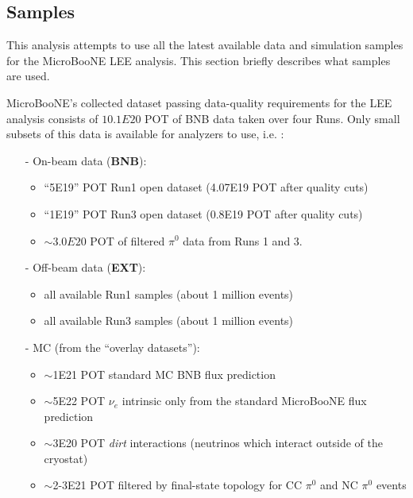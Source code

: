 \documentclass[a4paper]{article}
\begin{document}
\subsection{Samples}
\par This analysis attempts to use all the latest available data and simulation samples for the MicroBooNE LEE analysis. This section briefly describes what samples are used.
\par MicroBooNE's collected dataset passing  data-quality requirements for the LEE analysis consists of $10.1E20$ POT of BNB data taken over four Runs. %
Only small subsets of this data is available for analyzers to use, i.e. :
\begin{itemize}
\item[-] On-beam data (\textbf{BNB}):
\begin{itemize}
\item ``5E19'' POT Run1 open dataset (4.07E19 POT after quality cuts)
\item  ``1E19'' POT Run3 open dataset  (0.8E19 POT after quality cuts) 
\item  $\sim3.0E20$ POT of filtered $\pi^0$ data from Runs 1 and 3. 
\end{itemize}
\item[-] Off-beam data (\textbf{EXT}):
\begin{itemize}
\item all available Run1 samples (about 1 million events)
\item all available Run3 samples (about 1 million events)
\end{itemize}
\item[-] MC (from the ``overlay datasets''):
\begin{itemize}
\item $\sim$1E21 POT standard MC BNB flux prediction
\item $\sim$5E22 POT $\nu_e$ intrinsic only from the standard MicroBooNE flux prediction
\item $\sim$3E20 POT  \emph{dirt} interactions (neutrinos which interact outside of the cryostat) 
\item $\sim$2-3E21 POT filtered by final-state topology for CC $\pi^0$ and NC $\pi^0$ events
\end{itemize}
\end{itemize}

\end{document}
